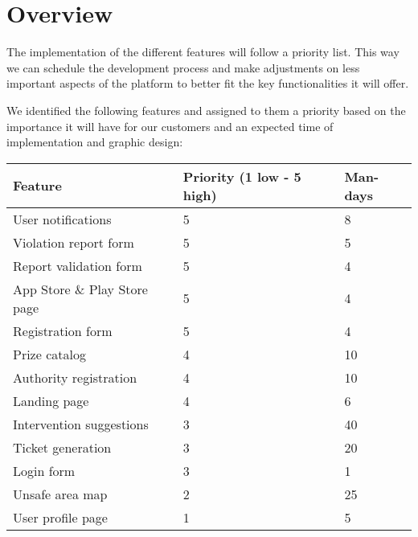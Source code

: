 \section{Overview}

The implementation of the different features will follow a priority list. This way
we can schedule the development process and make adjustments on less important aspects of
the platform to better fit the key functionalities it will offer.

We identified the following features and assigned to them a priority based on the importance
it will have for our customers and an expected time of implementation and graphic design:

\begin{table}[H]
  \centering
  \begin{tabular}{l|l|l}
    \hline
    \textbf{Feature} & \textbf{Priority (1 low - 5 high)} & \textbf{Man-days} \\
    \hline
    User notifications & 5 & 8 \\
    Violation report form & 5 & 5 \\
    Report validation form & 5 & 4 \\
    App Store \& Play Store page & 5 & 4 \\
    Registration form & 5 & 4 \\
    Prize catalog & 4 & 10 \\
    Authority registration & 4 & 10 \\
    Landing page & 4 & 6 \\
    Intervention suggestions & 3 & 40 \\
    Ticket generation & 3 & 20 \\
    Login form & 3 & 1 \\
    Unsafe area map & 2 & 25 \\
    User profile page & 1 & 5 \\
  \end{tabular}
\end{table}